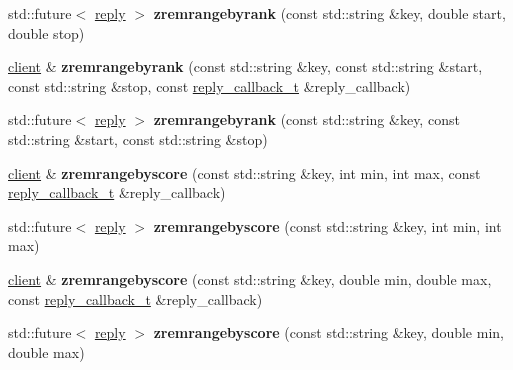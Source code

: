 \begin{DoxyCompactItemize}
std\+::future$<$ \hyperlink{classcpp__redis_1_1reply}{reply} $>$ {\bfseries zremrangebyrank} (const std\+::string \&key, double start, double stop)
\item 
\mbox{\label{classcpp__redis_1_1client_aafca4e3ca703fff85b1b6a1c9476c958}} 
\hyperlink{classcpp__redis_1_1client}{client} \& {\bfseries zremrangebyrank} (const std\+::string \&key, const std\+::string \&start, const std\+::string \&stop, const \hyperlink{classcpp__redis_1_1client_a061a1140d36d2eaeda82b09a0bb3f9f2}{reply\+\_\+callback\+\_\+t} \&reply\+\_\+callback)
\item 
\mbox{\label{classcpp__redis_1_1client_a2215c127cf351c43b69f62d871e7acb7}} 
std\+::future$<$ \hyperlink{classcpp__redis_1_1reply}{reply} $>$ {\bfseries zremrangebyrank} (const std\+::string \&key, const std\+::string \&start, const std\+::string \&stop)
\item 
\mbox{\label{classcpp__redis_1_1client_a8de95c0d340cc58d81fe5ca9b576d5b8}} 
\hyperlink{classcpp__redis_1_1client}{client} \& {\bfseries zremrangebyscore} (const std\+::string \&key, int min, int max, const \hyperlink{classcpp__redis_1_1client_a061a1140d36d2eaeda82b09a0bb3f9f2}{reply\+\_\+callback\+\_\+t} \&reply\+\_\+callback)
\item 
\mbox{\label{classcpp__redis_1_1client_a1317e67f2993b71bce596d28bce009b9}} 
std\+::future$<$ \hyperlink{classcpp__redis_1_1reply}{reply} $>$ {\bfseries zremrangebyscore} (const std\+::string \&key, int min, int max)
\item 
\mbox{\label{classcpp__redis_1_1client_a62354f918bcc9fd99562f1fe25dadec7}} 
\hyperlink{classcpp__redis_1_1client}{client} \& {\bfseries zremrangebyscore} (const std\+::string \&key, double min, double max, const \hyperlink{classcpp__redis_1_1client_a061a1140d36d2eaeda82b09a0bb3f9f2}{reply\+\_\+callback\+\_\+t} \&reply\+\_\+callback)
\item 
\mbox{\label{classcpp__redis_1_1client_ab40737e3dd44d39d708ab9e545f1d068}} 
std\+::future$<$ \hyperlink{classcpp__redis_1_1reply}{reply} $>$ {\bfseries zremrangebyscore} (const std\+::string \&key, double min, double max)
\item 

\end{DoxyCompactItemize}
